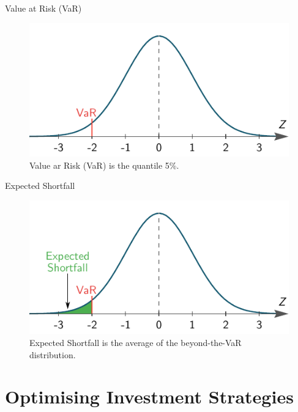 \documentclass[10pt]{beamer}
\begin{document}
\begin{frame}[fragile]{Value at Risk (VaR)}
  \begin{figure}[h]
    \centering
    \includegraphics[scale=1]{var.pdf}
    \caption{Value ar Risk (VaR) is the quantile 5\%.}
    \label{fig:var}
  \end{figure}
\end{frame}

\begin{frame}[fragile]{Expected Shortfall}

  \begin{figure}[h]
    \centering
    \includegraphics[scale=1]{es.pdf}
    \caption{Expected Shortfall is the average of the beyond-the-VaR distribution.}
    \label{fig:es}
\end{figure}
\end{frame}

\section{Optimising Investment Strategies}
\end{document}

